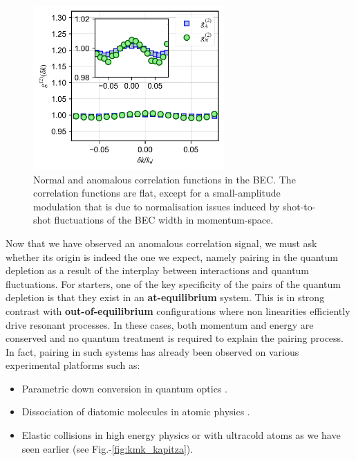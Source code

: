 \begin{figure}
    \centering
    \includegraphics[width=0.65\textwidth]{Fig/Chapter4/correlations_BEC.png}
    \caption{Normal and anomalous correlation functions in the BEC. The correlation functions are flat, except for a small-amplitude modulation that is due to normalisation issues induced by shot-to-shot fluctuations of the BEC width in momentum-space.}
    \label{fig:BEC_correlations}
\end{figure}

Now that we have observed an anomalous correlation signal, we must ask whether its origin is indeed the one we expect, namely \kmk pairing in the quantum depletion as a result of the interplay between interactions and quantum fluctuations. For starters, one of the key specificity of the \kmk pairs of the quantum depletion is that they exist in an \textbf{at-equilibrium} system. This is in strong contrast with \textbf{out-of-equilibrium} configurations where non linearities efficiently drive resonant processes. In these cases, both momentum and energy are conserved and no quantum treatment is required to explain the pairing process. In fact, \kmk pairing in such systems has already been observed on various experimental platforms such as:

\begin{itemize}
    \item Parametric down conversion in quantum optics \cite{burnham1970}.
    \item Dissociation of diatomic molecules in atomic physics \cite{greiner2005}.
    \item Elastic collisions in high energy physics \cite{arnison1982} or with ultracold atoms \cite{perrin2007observation} as we have seen earlier (see Fig.-\ref{fig:kmk_kapitza}).
\end{itemize}

